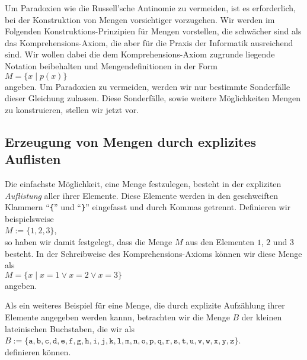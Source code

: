 Um  Paradoxien wie die Russell'sche Antinomie  zu vermeiden, ist es erforderlich, bei der
Konstruktion von Mengen vorsichtiger vorzugehen.
Wir werden im Folgenden Konstruktions-Prinzipien f\"{u}r Mengen vorstellen,
die schw\"{a}cher sind als das Komprehensions-Axiom, die aber f\"{u}r die Praxis der Informatik
ausreichend sind.  Wir wollen dabei die dem Komprehensions-Axiom zugrunde liegende Notation 
beibehalten und Mengendefinitionen in der Form \\[0.2cm]
\hspace*{1.3cm} $M = \{ x \mid p(x) \}$  \\[0.2cm]
angeben.  Um Paradoxien zu vermeiden, werden wir nur bestimmte
Sonderf\"{a}lle dieser Gleichung zulassen.  Diese Sonderf\"{a}lle, sowie weitere M\"{o}glichkeiten
Mengen zu konstruieren, stellen wir jetzt vor.

\subsection{Erzeugung von Mengen durch explizites Auflisten}
Die einfachste M\"{o}glichkeit, eine Menge festzulegen, besteht in der expliziten
\emph{Auflistung} aller ihrer Elemente. Diese Elemente werden in den geschweiften
Klammern ``\texttt{\{}'' und ``\texttt{\}}'' eingefasst und durch Kommas getrennt.
Definieren wir beispielsweise \\[0.2cm]
\hspace*{1.3cm} $M := \{ 1, 2, 3 \}$, \\[0.2cm]
so haben wir damit festgelegt, dass die Menge $M$ aus den Elementen $1$, $2$ und $3$
besteht. In der Schreibweise des Komprehensions-Axioms k\"{o}nnen wir diese Menge als \\[0.2cm]
\hspace*{1.3cm} $M = \{ x \mid x = 1 \vee x = 2 \vee x = 3 \}$ \\[0.2cm]
angeben.

Als ein weiteres Beispiel f\"{u}r eine Menge, die durch explizite Aufz\"{a}hlung ihrer Elemente
angegeben werden kannn, betrachten wir die Menge $B$ der kleinen lateinischen Buchstaben, die wir als \\[0.2cm]
\hspace*{1.3cm} 
$B := \{\mathtt{a}, \mathtt{b}, \mathtt{c}, \mathtt{d}, \mathtt{e},
 \mathtt{f}, \mathtt{g}, \mathtt{h}, \mathtt{i}, \mathtt{j}, \mathtt{k}, \mathtt{l},
 \mathtt{m}, \mathtt{n}, \mathtt{o}, \mathtt{p}, \mathtt{q}, \mathtt{r}, \mathtt{s},
 \mathtt{t}, \mathtt{u}, \mathtt{v}, \mathtt{w}, \mathtt{x}, \mathtt{y}, \mathtt{z\}}$.
\\[0.2cm]
definieren k\"{o}nnen.

